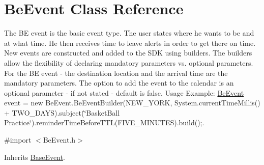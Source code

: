 \hypertarget{interface_be_event}{}\section{Be\+Event Class Reference}
\label{interface_be_event}


The B\+E event is the basic event type. The user states where he wants to be and at what time. He then receives time to leave alerts in order to get there on time. New events are constructed and added to the S\+D\+K using builders. The builders allow the flexibility of declaring mandatory parameters vs. optional parameters. For the B\+E event -\/ the destination location and the arrival time are the mandatory parameters. The option to add the event to the calendar is an optional parameter -\/ if not stated -\/ default is false. Usage Example\+: \hyperlink{interface_be_event}{Be\+Event} event = new Be\+Event.\+Be\+Event\+Builder(N\+E\+W\+\_\+\+Y\+O\+R\+K, System.\+current\+Time\+Millis() + T\+W\+O\+\_\+\+D\+A\+Y\+S).subject(\char`\"{}\+Basket\+Ball Practice\char`\"{}).reminder\+Time\+Before\+T\+T\+L(\+F\+I\+V\+E\+\_\+\+M\+I\+N\+U\+T\+E\+S).build();.  




{\ttfamily \#import $<$Be\+Event.\+h$>$}



Inherits \hyperlink{interface_base_event}{Base\+Event}.

